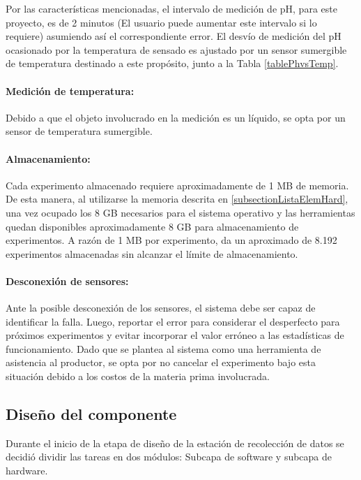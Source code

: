            \par Por las características mencionadas, el intervalo de medición  de pH, para este proyecto, es de 2 minutos (El usuario puede aumentar este intervalo si lo requiere) asumiendo así el correspondiente error. El desvío de medición del pH ocasionado por la temperatura de sensado es ajustado por un sensor sumergible de temperatura destinado a este propósito, junto a la Tabla \ref{tablePhvsTemp}.
        
        \paragraph{Medición de temperatura:} 
            Debido a que el objeto involucrado en la medición es un líquido, se opta por un sensor de temperatura sumergible.
    
        \paragraph{Almacenamiento:} 
        Cada experimento almacenado requiere aproximadamente de 1 MB de memoria. De esta manera, al utilizarse la memoria descrita en \ref{subsectionListaElemHard}, una vez ocupado los 8 GB necesarios para el sistema operativo y las herramientas quedan disponibles aproximadamente 8 GB para almacenamiento de experimentos. A razón de 1 MB por experimento, da un aproximado de 8.192 experimentos almacenadas sin alcanzar el límite de almacenamiento. 
        
        \paragraph{Desconexión de sensores:} 
             Ante la posible desconexión de los sensores, el sistema debe ser capaz de identificar la falla. Luego, reportar el error para considerar el desperfecto para próximos experimentos y evitar incorporar el valor erróneo a las estadísticas de funcionamiento. Dado que se plantea al sistema como una herramienta de asistencia al productor, se opta por no cancelar el experimento bajo esta situación debido a los costos de la materia prima involucrada.
            
            
    \subsection{Diseño del componente}
            \par Durante el inicio de la etapa de diseño de la estación de recolección de datos se decidió dividir las tareas en dos módulos: Subcapa de software y subcapa de hardware.
            
